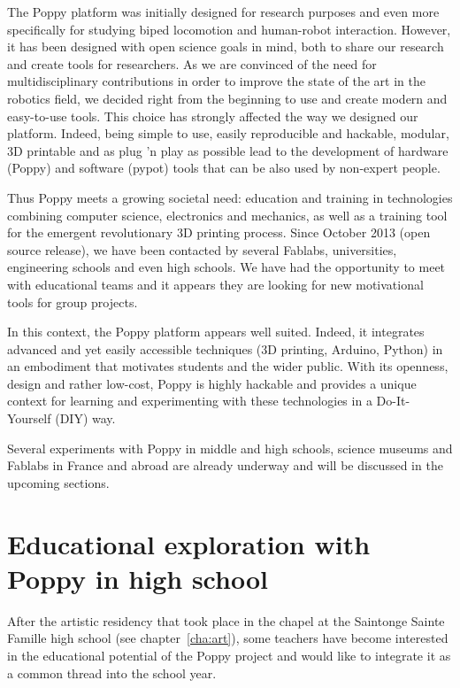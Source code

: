 The Poppy platform was initially designed for research purposes and even more specifically for studying biped locomotion and human-robot interaction. However, it has been designed with open science goals in mind, both to share our research and create tools for researchers. As we are convinced of the need for multidisciplinary contributions in order to improve the state of the art in the robotics field, we decided right from the beginning to use and create modern and easy-to-use tools. This choice has strongly affected the way we designed our platform. Indeed, being simple to use, easily reproducible and hackable, modular, 3D printable and as plug 'n play as possible lead to the development of hardware (Poppy) and software (pypot) tools that can be also used by non-expert people.

Thus Poppy meets a growing societal need: education and training in technologies combining computer science, electronics and mechanics, as well as a training tool for the emergent revolutionary 3D printing process. Since October 2013 (open source release), we have been contacted by several Fablabs, universities, engineering schools and even high schools. We have had the opportunity to meet with educational teams and it appears they are looking for new motivational tools for group projects.

In this context, the Poppy platform appears well suited. Indeed, it integrates advanced and yet easily accessible techniques (3D printing, Arduino, Python) in an embodiment that motivates students and the wider public. With its openness, design and rather low-cost, Poppy is highly hackable and provides a unique context for learning and experimenting with these technologies in a Do-It-Yourself (DIY) way.

Several experiments with Poppy in middle and high schools, science museums and Fablabs in France and abroad are already underway and will be discussed in the upcoming sections.


\section{Educational exploration with Poppy in high school} %

After the artistic residency that took place in the chapel at the Saintonge Sainte Famille high school (see chapter~\ref{cha:art}), some teachers have become interested in the educational potential of the Poppy project and would like to integrate it as a common thread into the school year.

